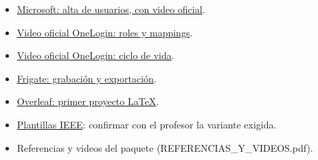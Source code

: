 \documentclass[12pt,a4paper]{article}
\begin{document}
\begin{itemize}
\item \href{https://learn.microsoft.com/en-us/microsoft-365/admin/add-users/add-users?view=o365-worldwide}{Microsoft: alta de usuarios, con video oficial}.
\item \href{https://www.onelogin.com/video/groups-roles-and-mappings-oh-my}{Video oficial OneLogin: roles y mappings}.
\item \href{https://www.onelogin.com/resource-center/videos/getting-started-with-identity-lifecycle-management-pt-2}{Video oficial OneLogin: ciclo de vida}.
\item \href{https://docs.frigate.video/configuration/record/}{Frigate: grabación y exportación}.
\item \href{https://docs.overleaf.com/getting-started/your-first-project}{Overleaf: primer proyecto LaTeX}.
\item \href{https://www.ieee.org/conferences/publishing/templates.html}{Plantillas IEEE}: confirmar con el profesor la variante exigida.
\item Referencias y videos del paquete (REFERENCIAS\_Y\_VIDEOS.pdf).
\end{itemize}
\end{document}
